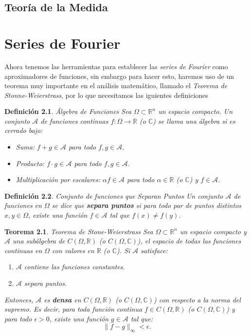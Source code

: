 \documentclass[letterpaper]{book}
\newtheorem{teorema}{Teorema}[section]
\newtheorem{def.}{Definici\'on}[section]
\newcommand{\om}{\ensuremath{\Omega}}
\newcommand{\re}{\ensuremath{\mathbb R }}
\begin{document}
\section{Teoría de la Medida}
\chapter{Series de Fourier}
\noindent Ahora tenemos las herramientas para establecer las \emph{series de Fourier} como aproximadores de funciones, sin embargo para hacer esto, haremos uso de un teorema muy importante en el análisis matemático, llamado el \emph{Teorema de Stonne-Weierstrass}, por lo que necesitamos las iguientes definiciones

\begin{def.}{Álgebra de Funciones}
    Sea \(\om\subset\re^n\) un espacio compacto. Un conjunto \(\mathcal{A}\) de funciones continuas \(f: \om \to \mathbb{R}\) (o \(\mathbb{C}\)) se llama una \emph{álgebra} si es cerrado bajo:
    \begin{itemize}
        \item Suma: \(f + g \in \mathcal{A}\) para todo \(f, g \in \mathcal{A}\).
        \item Producto: \(f \cdot g \in \mathcal{A}\) para todo \(f, g \in \mathcal{A}\).
        \item Multiplicación por escalares: \(\alpha f \in \mathcal{A}\) para todo \(\alpha \in \mathbb{R}\) (o \(\mathbb{C}\)) y \(f \in \mathcal{A}\).
    \end{itemize}
\end{def.}
\begin{def.}{Conjunto de funciones que Separan Puntos}
Un conjunto \(\mathcal{A}\) de funciones en \(\om\) se dice que \textbf{separa puntos} si para todo par de puntos distintos \(x, y \in \om\), existe una función \(f \in \mathcal{A}\) tal que \(f(x) \neq f(y)\).
\end{def.}

\begin{teorema}{Teorema de Stone-Weierstrass}
Sea \(\om\subset\re^n\) un espacio compacto y \(\mathcal{A}\) una subálgebra de \(C(\om, \mathbb{R})\) (o \(C(\om, \mathbb{C})\)), el espacio de todas las funciones continuas en \(\om\) con valores en \(\mathbb{R}\) (o \(\mathbb{C}\)). Si \(\mathcal{A}\) satisface:
\begin{enumerate}
    \item \(\mathcal{A}\) contiene las funciones constantes.
    \item \(\mathcal{A}\) separa puntos.
\end{enumerate}
Entonces, \(\mathcal{A}\) es \textbf{densa} en \(C(\om, \mathbb{R})\) (o \(C(\om, \mathbb{C})\)) con respecto a la norma del supremo. Es decir, para toda función continua \(f \in C(\om, \mathbb{R})\) (o \(C(\om, \mathbb{C})\)) y para todo \(\epsilon > 0\), existe una función \(g \in \mathcal{A}\) tal que:
\[
\|f - g\|_\infty < \epsilon.
\]
\end{teorema}
\end{document}
